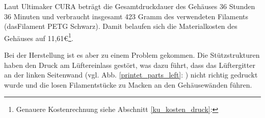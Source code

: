 \noindent Laut Ultimaker CURA beträgt die Gesamtdruckdauer des Gehäuses 36 Stunden 36 Minuten und verbraucht insgesamt 423 Gramm des verwendeten Filaments (dasFilament PETG Schwarz). 
Damit belaufen sich die Materialkosten des Gehäuses auf 11,61\euro{}\footnote{Genauere Kostenrechnung siehe Abschnitt \ref{ku_kosten_druck}: }.\par
\noindent Bei der Herstellung ist es aber zu einem Problem gekommen. 
Die Stützstrukturen haben den Druck am Lüftereinlass gestört, was dazu führt, dass das Lüftergitter an der  linken Seitenwand (vgl. Abb. \ref{printet_parts_left}: ) nicht richtig gedruckt wurde und die losen Filamentstücke zu Macken an den Gehäusewänden führen.
